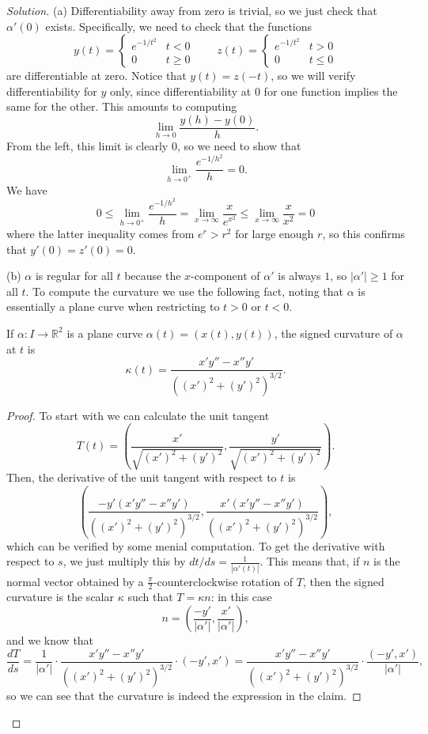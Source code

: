 \documentclass[11pt]{scrartcl}
\providecommand{\RR}{\mathbb R}
\newenvironment{soln}{\begin{proof}[Solution]}{\end{proof}}
\begin{document}
\begin{soln}
	(a) Differentiability away from zero is trivial, so we just check
	that $\alpha'(0)$ exists. Specifically, we need to check that the functions
	\[y(t) = \begin{cases}
		e^{-1/t^2} & t < 0\\
		0 & t\ge 0
	\end{cases}\qquad z(t) = \begin{cases}
		e^{-1/t^2} & t > 0\\
		0 & t\le 0
	\end{cases}\]
	are differentiable at zero. Notice that $y(t) = z(-t)$,
	so we will verify differentiability for $y$ only,
	since differentiability at $0$
	for one function implies the same for the other.
	This amounts to computing
	\[\lim_{h\to 0} \frac{y(h) - y(0)}{h}.\]
	From the left, this limit is clearly $0$, so we need to show that
	\[\lim_{h\to 0^+} \frac{e^{-1/h^2}}{h} = 0.\]
	We have
	\[0\le\lim_{h\to 0^+} \frac{e^{-1/h^2}}{h}=
	\lim_{x\to\infty} \frac{x}{e^{x^2}} \le
	\lim_{x\to\infty} \frac{x}{x^2} = 0\]
	where the latter inequality comes from $e^r > r^2$ for large enough $r$,
	so this confirms that $y'(0) = z'(0) = 0$.
	
	(b) $\alpha$ is regular for all $t$ because the $x$-component
	of $\alpha'$ is always $1$, so $|\alpha'| \ge 1$ for all $t$.
	To compute the curvature we use the following fact,
	noting that $\alpha$ is essentially a plane curve
	when restricting to $t > 0$ or $t < 0$.
	\begin{claim*}[Problem 1.5.12(d)]
		If $\alpha\colon I\to\RR^2$ is a plane curve
		$\alpha(t) = (x(t), y(t))$, the signed curvature of $\alpha$ at $t$ is
		\[\kappa(t) = \frac{x'y'' - x''y'}{((x')^2 + (y')^2)^{3/2}}.\]
	\end{claim*}
	\begin{proof}
		To start with we can calculate the unit tangent
		\[T(t) = \left(\frac{x'}{\sqrt{(x')^2 + (y')^2}},
		\frac{y'}{\sqrt{(x')^2 + (y')^2}}\right).\]
		Then, the derivative of the unit tangent with respect to $t$ is
		\[\left(\frac{-y'(x'y'' - x''y')}{((x')^2 + (y')^2)^{3/2}},
		\frac{x'(x'y'' - x''y')}{((x')^2 + (y')^2)^{3/2}}\right),\]
		which can be verified by some menial computation.
		To get the derivative with respect to $s$, we just multiply this by
		$dt/ds = \frac1{|\alpha'(t)|}$. This means that,
		if $n$ is the normal vector obtained by a $\frac\pi2$-counterclockwise
		rotation of $T$, then the signed curvature is the scalar $\kappa$
		such that $T = \kappa n$: in this case
		\[n = \left(\frac{-y'}{|\alpha'|}, \frac{x'}{|\alpha'|}\right),\]
		and we know that
		\[\frac{dT}{ds} = \frac{1}{|\alpha'|}\cdot
		\frac{x'y'' - x''y'}{((x')^2 + (y')^2)^{3/2}}\cdot(-y',x') =
		\frac{x'y'' - x''y'}{((x')^2 + (y')^2)^{3/2}}\cdot
		\frac{(-y', x')}{|\alpha'|},\]
		so we can see that the curvature is indeed
		the expression in the claim.
	\end{proof}
	

\end{soln}
\end{document}
